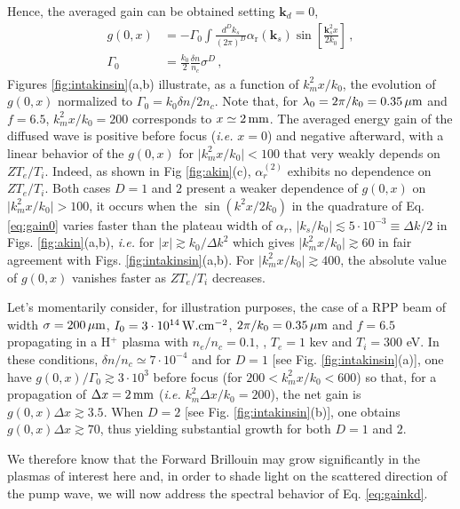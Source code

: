 \documentclass[
 reprint,
 amsmath,amssymb,
 aps,
]{revtex4-1}
\begin{document}
Hence, the averaged gain can be obtained setting $\mathbf{k}_d=0$,
\begin{align}
g(0,x)&=  -\Gamma_0 \int \frac{d^Dk_s}{(2\pi)^D}  \alpha_\mathrm{r}(\mathbf{k}_s) 
\sin\left[ \frac{\mathbf{k}_s^2 x}{2k_0}\right]\, , \nonumber\\
\Gamma_0&=\frac{k_0}{2}  \frac{\delta n}{n_c}
  \sigma^D \, ,
\label{eq:gain0}
\end{align}
Figures \ref{fig:intakinsin}(a,b) illustrate, as a function of $k_m^2 x /k_0$, the evolution of $g(0,x)$
normalized to $\Gamma_0=k_0\delta n / 2n_c$. Note that, for $\lambda_0=2\pi/k_0=0.35\,\rm\mu m$ and $f=6.5$,  $k_m^2 x /k_0=200$ corresponds to $x\simeq 2\,\rm mm$. 
The averaged energy gain of the diffused wave is positive before focus (\emph{i.e.} $x=0$) and negative afterward, with  a linear behavior of the $g(0,x)$ for  $\vert k_m^2 x /k_0 \vert < 100$  that very weakly depends on $ZT_e/T_i$.  Indeed, as shown in Fig \ref{fig:akin}(c), $\alpha_r^{(2)}$ exhibits no dependence  on $ZT_e/T_i$. Both cases $D=1$ and $2$ present a weaker dependence of $g(0,x)$ on $\vert k_m^2 x /k_0 \vert > 100$, it occurs when the $\sin(k^2x/2k_0)$ in the quadrature of Eq. \eqref{eq:gain0} varies faster than the plateau width of $\alpha_r$, $\vert k_s/k_0\vert \lesssim 5\cdot 10^{-3}\equiv \Delta k /2$ in Figs. \ref{fig:akin}(a,b), \emph{i.e.} for $\vert x\vert \gtrsim k_0/\Delta k^2$ which gives $\vert k_m^2x/k_0 \vert  \gtrsim 60  $ in fair  agreement with Figs. \ref{fig:intakinsin}(a,b).
For $\vert k_m^2 x /k_0 \vert \gtrsim 400$, the absolute value of $g(0,x)$ vanishes faster as $ZT_e/T_i$ decreases. 

Let's momentarily consider, for illustration purposes,  the  case of a RPP beam of width $\sigma =200\,\rm\mu m$, $I_0=3\cdot 10^{14} \,\rm W.cm^{-2}$, $2\pi/k_0 = 0.35\,\rm\mu m$ and $f = 6.5$ propagating in a H$^{+}$ plasma with $n_e/n_c=0.1$, , $T_e=1$ kev and $T_i=300$ eV. In these conditions, $\delta n/n_c \simeq 7\cdot 10^{-4}$ and  for $D=1$ [see Fig. \ref{fig:intakinsin}(a)], one have $g(0,x)/\Gamma_0 \gtrsim 3\cdot 10^3$ before focus (for $200< k_m^2 x/k_0 < 600$) so that, for  a propagation of $\Delta x = 2\,\rm mm$ (\emph{i.e.} $k_m^2 \Delta x/k_0 = 200$), the net gain is $g(0,x)\Delta x\gtrsim 3.5 $. When $D=2$ [see Fig. \ref{fig:intakinsin}(b)], one obtains $g(0,x)\Delta x\gtrsim 70 $, thus yielding substantial growth for both $D=1$ and $2$.

We therefore know that the Forward Brillouin may grow significantly in the plasmas  of interest here and, in order to shade light on the scattered  direction of the pump wave, we will now address the spectral behavior of Eq. \eqref{eq:gainkd}.
\end{document}
